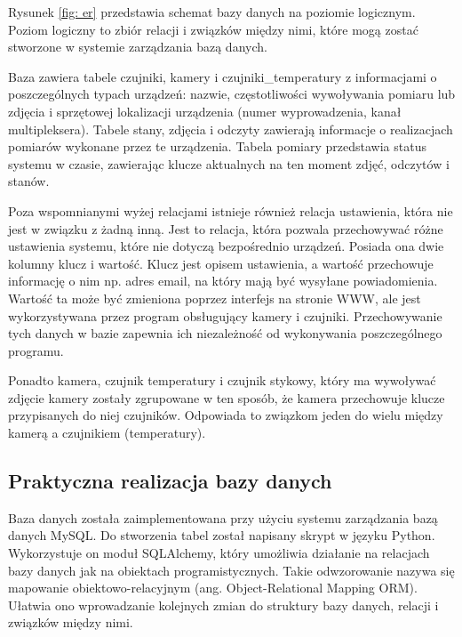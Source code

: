 \documentclass[a4paper,12pt,twoside]{article}
\begin{document}
Rysunek \ref{fig: er} przedstawia schemat bazy danych na poziomie logicznym. Poziom logiczny to zbiór relacji i związków między nimi, które mogą zostać stworzone w systemie zarządzania bazą danych.  

Baza zawiera tabele czujniki, kamery i czujniki{\_}temperatury z informacjami o poszczególnych typach urządzeń: nazwie, częstotliwości wywoływania pomiaru lub zdjęcia i sprzętowej lokalizacji urządzenia (numer wyprowadzenia, kanał multipleksera). Tabele stany, zdjęcia i odczyty zawierają informacje o realizacjach pomiarów wykonane przez te urządzenia. Tabela pomiary przedstawia status systemu w czasie, zawierając klucze aktualnych na ten moment zdjęć, odczytów i stanów. 

Poza wspomnianymi wyżej relacjami istnieje również relacja ustawienia, która nie jest w związku z żadną inną. Jest to relacja, która pozwala przechowywać różne ustawienia systemu, które nie dotyczą bezpośrednio urządzeń. Posiada ona dwie kolumny klucz i wartość. Klucz jest opisem ustawienia, a wartość przechowuje informację o nim np. adres email, na który mają być wysyłane powiadomienia. Wartość ta może być zmieniona poprzez interfejs na stronie WWW, ale jest wykorzystywana przez program obsługujący kamery i czujniki. Przechowywanie tych danych w bazie zapewnia ich niezależność od wykonywania poszczególnego programu.

Ponadto kamera, czujnik temperatury i czujnik stykowy, który ma wywoływać zdjęcie kamery zostały zgrupowane w ten sposób, że kamera przechowuje klucze przypisanych do niej czujników. Odpowiada to związkom jeden do wielu między kamerą a czujnikiem (temperatury).

\subsection{Praktyczna realizacja bazy danych}
Baza danych została zaimplementowana przy użyciu systemu zarządzania bazą danych MySQL. Do stworzenia tabel został napisany skrypt w języku Python. Wykorzystuje on moduł SQLAlchemy, który umożliwia działanie na relacjach bazy danych jak na obiektach programistycznych. Takie odwzorowanie nazywa się mapowanie obiektowo-relacyjnym (ang. Object-Relational Mapping ORM). Ułatwia ono wprowadzanie kolejnych zmian do struktury bazy danych, relacji i związków między nimi.
\end{document}
